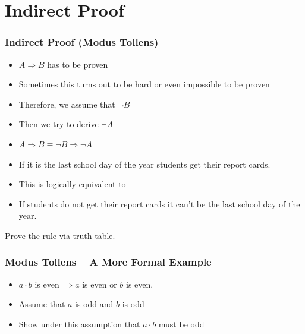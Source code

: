 \documentclass{beamer}
\theoremstyle{remark}
\begin{document}
\section{Indirect Proof}
\begin{frame}
\frametitle{Indirect Proof (Modus Tollens)}
	
\begin{itemize}
	\item $A \Rightarrow B$ has to be proven
	\pause
	\item Sometimes this turns out to be hard or even impossible to be proven
	\pause
	\item Therefore, we assume that $\lnot B$
	\pause
	\item Then we try to derive $\lnot A$
	\pause
	\item $A \Rightarrow B \equiv \lnot B \Rightarrow \lnot A$ 
\end{itemize}

\pause
\begin{example}
\begin{itemize}
	 \item If it is the last school day of the year students get their report cards.
	 \pause
	 \item This is logically equivalent to
	 \pause
	 \item If students do not get their report cards it can't be the last school day of the year.
\end{itemize}
\end{example}
\pause
Prove the rule via truth table.
\end{frame}

\begin{frame}
\frametitle{Modus Tollens -- A More Formal Example}
\begin{example}
\begin{itemize}
	 \item $a \cdot b$ is even $\Rightarrow a$ is even or $b$ is even.
	 \pause
	 \item Assume that $a$ is odd and $b$ is odd
	 \pause
	 \item Show under this assumption that $a \cdot b$ must be odd
\end{itemize}
\end{example}
\end{frame}
\end{document}
